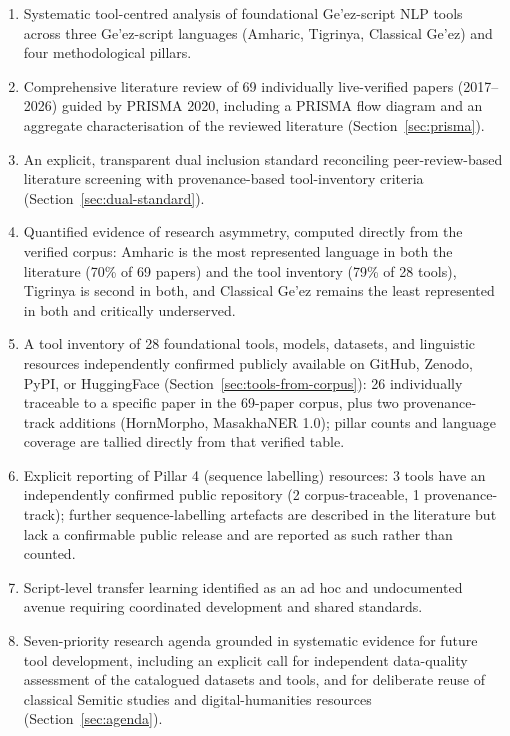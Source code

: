 \documentclass[sn-mathphys-num]{sn-jnl}
\theoremstyle{thmstyleone}
\theoremstyle{thmstyletwo}
\theoremstyle{thmstylethree}
\begin{document}
\begin{enumerate}
    \item Systematic tool-centred analysis of foundational Ge'ez-script NLP tools across three Ge'ez-script languages (Amharic, Tigrinya, Classical Ge'ez) and four methodological pillars.
    \item Comprehensive literature review of 69 individually live-verified papers (2017--2026) guided by PRISMA 2020, including a PRISMA flow diagram and an aggregate characterisation of the reviewed literature (Section~\ref{sec:prisma}).
    \item An explicit, transparent dual inclusion standard reconciling peer-review-based literature screening with provenance-based tool-inventory criteria (Section~\ref{sec:dual-standard}).
    \item Quantified evidence of research asymmetry, computed directly from the verified corpus: Amharic is the most represented language in both the literature (70\% of 69 papers) and the tool inventory (79\% of 28 tools), Tigrinya is second in both, and Classical Ge'ez remains the least represented in both and critically underserved.
    \item A tool inventory of 28 foundational tools, models, datasets, and linguistic resources independently confirmed publicly available on GitHub, Zenodo, PyPI, or HuggingFace (Section~\ref{sec:tools-from-corpus}): 26 individually traceable to a specific paper in the 69-paper corpus, plus two provenance-track additions (HornMorpho, MasakhaNER 1.0); pillar counts and language coverage are tallied directly from that verified table.
    \item Explicit reporting of Pillar 4 (sequence labelling) resources: 3 tools have an independently confirmed public repository (2 corpus-traceable, 1 provenance-track); further sequence-labelling artefacts are described in the literature but lack a confirmable public release and are reported as such rather than counted.
    \item Script-level transfer learning identified as an ad hoc and undocumented avenue requiring coordinated development and shared standards.
    \item Seven-priority research agenda grounded in systematic evidence for future tool development, including an explicit call for independent data-quality assessment of the catalogued datasets and tools, and for deliberate reuse of classical Semitic studies and digital-humanities resources (Section~\ref{sec:agenda}).
\end{enumerate}
\end{document}
